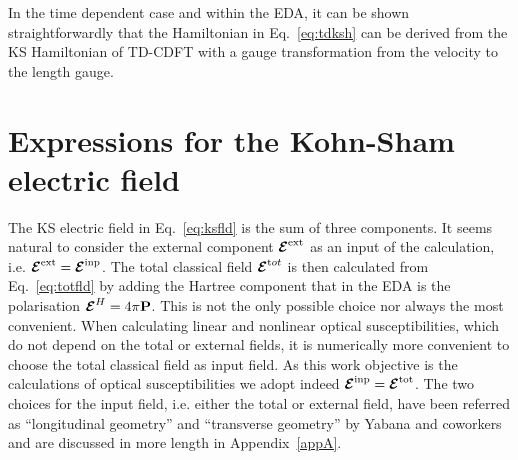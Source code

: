 In the time dependent case and within the EDA,
it can be shown straightforwardly that the Hamiltonian
in Eq.~\eqref{eq:tdksh} can be derived from the KS Hamiltonian of TD-CDFT
with a gauge transformation from the velocity to the length gauge.\cite{maitra2003current}


\section{Expressions for the Kohn-Sham electric field}
\label{sc:ksef}

The KS electric field in Eq.~\eqref{eq:ksfld} is the sum of three components. It seems natural to consider the external component $\boldsymbol{\cal E}^{\text{ext}}$ as an input of the calculation, i.e. $\boldsymbol{\cal E}^{\text{ext}} = \boldsymbol{\cal E}^{\text{inp}}$. The total classical field $\boldsymbol{\cal E}^{\text tot}$ is then calculated from Eq.~\eqref{eq:totfld} by adding the Hartree component that in the EDA is the polarisation $\boldsymbol{\cal E}^{H} = 4 \pi {\bf P}$. This is not the only possible choice nor always the most convenient. When calculating linear and nonlinear optical susceptibilities, which do not depend on the total or external fields, it is numerically more convenient to choose the total classical field as input field. As this work objective is the calculations of optical susceptibilities we adopt indeed $\boldsymbol{\cal E}^{\text{inp}} = \boldsymbol{\cal E}^{\text{tot}}$.  The two choices for the input field, i.e. either the total or external field, have been referred as ``longitudinal geometry'' and ``transverse geometry'' by Yabana and coworkers\cite{PhysRevB.85.045134} and are discussed in more length in Appendix~\ref{appA}. 

